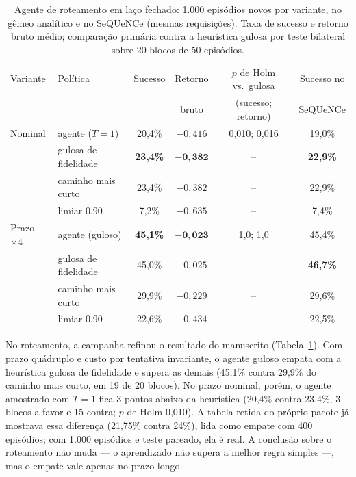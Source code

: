 \documentclass[12pt]{article}
\begin{document}
\begin{table}[ht]
\centering
\caption{Agente de roteamento em laço fechado: 1.000 episódios novos por
variante, no gêmeo analítico e no SeQUeNCe (mesmas requisições). Taxa de sucesso
e retorno bruto médio; comparação primária contra a heurística gulosa por teste
bilateral sobre 20 blocos de 50 episódios.}
\label{tab:rot_lf}
\small
\begin{tabular}{llcccc}
\toprule
Variante & Política & Sucesso & Retorno & $p$ de Holm vs.\ gulosa & Sucesso no \\
 & & & bruto & (sucesso; retorno) & SeQUeNCe \\
\midrule
Nominal & agente ($T=1$) & 20,4\% & $-0{,}416$ & 0,010; 0,016 & 19,0\% \\
 & gulosa de fidelidade & \textbf{23,4\%} & $\mathbf{-0{,}382}$ & -- & \textbf{22,9\%} \\
 & caminho mais curto & 23,4\% & $-0{,}382$ & -- & 22,9\% \\
 & limiar 0,90 & 7,2\% & $-0{,}635$ & -- & 7,4\% \\
Prazo $\times4$ & agente (guloso) & \textbf{45,1\%} & $\mathbf{-0{,}023}$ & 1,0; 1,0 & 45,4\% \\
 & gulosa de fidelidade & 45,0\% & $-0{,}025$ & -- & \textbf{46,7\%} \\
 & caminho mais curto & 29,9\% & $-0{,}229$ & -- & 29,6\% \\
 & limiar 0,90 & 22,6\% & $-0{,}434$ & -- & 22,5\% \\
\bottomrule
\end{tabular}
\end{table}

No roteamento, a campanha refinou o resultado do manuscrito
(Tabela~\ref{tab:rot_lf}). Com prazo quádruplo e custo por tentativa invariante,
o agente guloso empata com a heurística gulosa de fidelidade e supera as demais
(45,1\% contra 29,9\% do caminho mais curto, em 19 de 20 blocos). No prazo
nominal, porém, o agente amostrado com $T=1$ fica 3 pontos abaixo da heurística
(20,4\% contra 23,4\%, 3 blocos a favor e 15 contra; $p$ de Holm 0,010). A
tabela retida do próprio pacote já mostrava essa diferença (21,75\% contra
24\%), lida como empate com 400 episódios; com 1.000 episódios e teste pareado,
ela é real. A conclusão sobre o roteamento não muda --- o aprendizado não supera
a melhor regra simples ---, mas o empate vale apenas no prazo longo.
\end{document}
